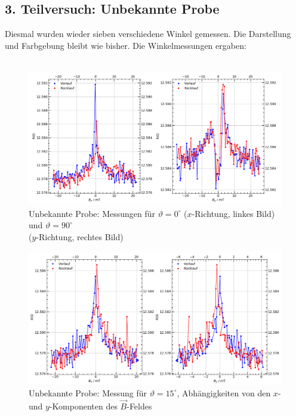 \documentclass[german,  %
parskip=full,  %
]{scrartcl}
\begin{document}
\subsection{3. Teilversuch: Unbekannte Probe}
Diesmal wurden wieder sieben verschiedene Winkel gemessen. Die Darstellung und Farbgebung bleibt wie bisher. Die Winkelmessungen ergaben: \\\\
\begin{figure}[h!]\centering
\includegraphics[width=\textwidth]{Probe3_0_und_90_Grad.png}
\caption{Unbekannte Probe: Messungen für \(\vartheta=0^{\circ}\) (\(x\)-Richtung, linkes Bild) und \(\vartheta=90^{\circ}\) \\ (\(y\)-Richtung, rechtes Bild)}
\end{figure} 
\begin{figure}[h!]\centering
\includegraphics[width=\textwidth]{Probe3_15_Grad.png}
\caption{Unbekannte Probe: Messung für \(\vartheta=15^{\circ}\), Abhängigkeiten von den \(x\)- und \(y\)-Komponenten des \(\vec{B}\)-Feldes}
\end{figure} 
\newpage
\end{document}
